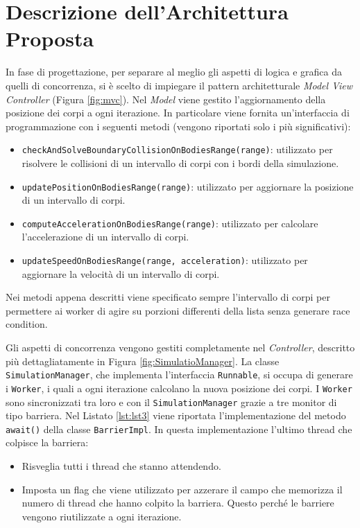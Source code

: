 \documentclass[12pt,a4paper,openright,twoside]{book}
\begin{document}
\chapter{Descrizione dell'Architettura Proposta}
\label{chap:Descrizione dell'Architettura Proposta}

In fase di progettazione, per separare al meglio gli aspetti di logica e grafica da quelli di concorrenza, si è scelto di
impiegare il pattern architetturale \textit{Model View Controller} (Figura \ref{fig:mvc}).
Nel \textit{Model} viene gestito l'aggiornamento della posizione dei corpi a ogni iterazione. In particolare viene fornita 
un'interfaccia di programmazione con i seguenti metodi (vengono riportati solo i più significativi):
\begin{itemize}
	\item \texttt{checkAndSolveBoundaryCollisionOnBodiesRange(range)}: 
	utilizzato per risolvere le collisioni di un intervallo di corpi con i bordi della simulazione.
	\item \texttt{updatePositionOnBodiesRange(range)}:
	utilizzato per aggiornare la posizione di un intervallo di corpi.
	\item \texttt{computeAccelerationOnBodiesRange(range)}:
	utilizzato per calcolare l'accelerazione di un intervallo di corpi.
	\item \texttt{updateSpeedOnBodiesRange(range, acceleration)}:
	utilizzato per aggiornare la velocità di un intervallo di corpi.
\end{itemize}
Nei metodi appena descritti viene specificato sempre l'intervallo di corpi per permettere ai worker di agire su porzioni 
differenti della lista senza generare race condition.

Gli aspetti di concorrenza vengono gestiti completamente nel \textit{Controller},
descritto più dettagliatamente in Figura \ref{fig:SimulatioManager}.
La classe \texttt{SimulationManager}, che implementa l'interfaccia \texttt{Runnable},
si occupa di generare i \texttt{Worker}, i quali a ogni iterazione
calcolano la nuova posizione dei corpi.
I \texttt{Worker} sono sincronizzati tra loro e con il \texttt{SimulationManager}
grazie a tre monitor di tipo barriera.
Nel Listato \ref{lst:lst3} viene riportata l'implementazione del metodo \texttt{await()} della classe \texttt{BarrierImpl}.
In questa implementazione l'ultimo thread che colpisce la barriera:
\begin{itemize}
	\item Risveglia tutti i thread che stanno attendendo.
	\item Imposta un flag che viene utilizzato per azzerare il campo
	che memorizza il numero di thread che hanno colpito la barriera.
	Questo perché le barriere vengono riutilizzate a ogni iterazione.
\end{itemize}
\end{document}

